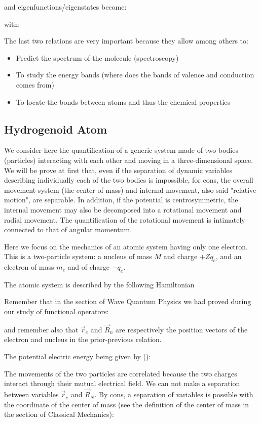 	and eigenfunctions/eigenstates become:
	
	with:
	
	The last two relations are very important because they allow among others to:
	\begin{itemize}
		\item Predict the spectrum of the molecule (spectroscopy)
		\item To study the energy bands (where does the bands of valence and conduction comes from)
		\item To locate the bonds between atoms and thus the chemical properties
	\end{itemize}
	
	\subsection{Hydrogenoid Atom}
	We consider here the quantification of a generic system made of two bodies (particles) interacting with each other and moving in a three-dimensional space. We will be prove at first that, even if the separation of dynamic variables describing individually each of the two bodies is impossible, for cons, the overall movement system (the center of mass) and internal movement, also said "relative motion", are separable. In addition, if the potential is centrosymmetric, the internal movement may also be decomposed into a rotational movement and radial movement. The quantification of the rotational movement is intimately connected to that of angular momentum.
	
	Here we focus on the mechanics of an atomic system having only one electron. This is a two-particle system: a nucleus of mass $M$ and charge $+Zq_e$, and an electron of mass $m_e$ and of charge $-q_e$.
	
	The atomic system is described by the following Hamiltonian
	
	Remember that in the section of Wave Quantum Physics we had proved during our study of functional operators:
	
	and remember also that $\vec{r}_e$ and $\vec{R}_n$ are respectively the position vectors of the electron and nucleus in the prior-previous relation.
	
	The potential electric energy being given by ():
	
	The movements of the two particles are correlated because the two charges interact through their mutual electrical field. We can not make a separation between variables $\vec{r}_e$ and $\vec{R}_N$. By cons, a separation of variables is possible with the coordinate of the center of mass (see the definition of the center of mass in the section of Classical Mechanics):
	
